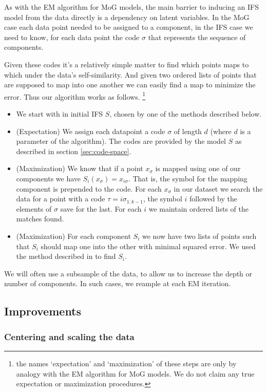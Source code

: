 \documentclass[10pt,a4paper,oneside]{article}
\theoremstyle{definition}
\begin{document}
As with the EM algorithm for MoG models, the main barrier to inducing an IFS model from the data directly is a dependency on latent variables. In the MoG case each data point needed to be assigned to a component, in the IFS case we need to know, for each data point the code $\sigma$ that represents the sequence of components. 

Given these codes it's a relatively simple matter to find which points maps to which under the data's self-similarity. And given two ordered lists of points that are supposed to map into one another we can easily find a map to minimize the error. Thus our algorithm works as follows. 
\footnote{the names `expectation' and `maximization' of these steps are only by analogy with the EM algorithm for MoG models. We do not claim any true expectation or maximization procedures.}

\begin{itemize}
\item We start with in initial IFS $S$, chosen by one of the methods described below. 
\item (Expectation) We assign each datapoint a code $\sigma$ of length $d$ (where $d$ is a parameter of the algorithm). The codes are provided by the model $S$ as described in section \ref{sec:code-space}. 
\item (Maximization) We know that if a point $x_\sigma$ is mapped using one of our components we have $S_i(x_\sigma) = x_{i\sigma}$. That is, the symbol for the mapping component is prepended to the code. For each $x_\sigma$ in our dataset we search the data for a point with a code $\tau = i\sigma_{1:k-1}$, the symbol $i$ followed by the elements of $\sigma$ save for the last. For each $i$ we maintain ordered lists of the matches found.
\item (Maximization) For each component $S_i$ we now have two lists of points such that $S_i$ should map one into the other with minimal squared error. We used the method described in \cite{umeyama1991least} to find $S_i$. 
\end{itemize}

We will often use a subsample of the data, to allow us to increase the depth or number of components. In such cases, we reample at each EM iteration.
 
\subsection*{Improvements}

\subsubsection*{Centering and scaling the data}
\end{document}
